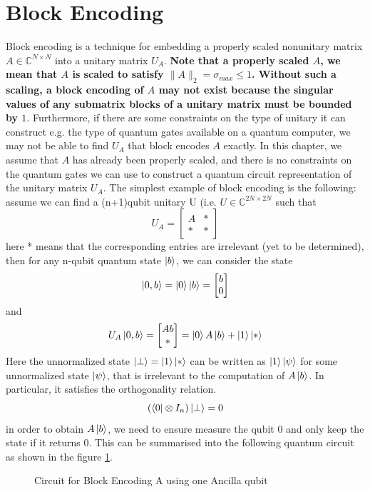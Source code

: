 \documentclass[12pt, oneside]{book}
\theoremstyle{definition}
\theoremstyle{definition}
\theoremstyle{remark}
\begin{document}
\section{Block Encoding}
Block encoding is a technique for embedding a properly scaled nonunitary matrix $A \in \mathbb{C}^{N\times N}$ into a unitary matrix $U_A$. \textbf{Note that a properly scaled $A$, we mean that $A$ is scaled to satisfy $\|A\|_2=\sigma_{max} \leq 1$. Without such a scaling, a block encoding of $A$ may not exist because the singular values of any submatrix blocks of a unitary matrix must be bounded by $1$}. Furthermore, if there are some constraints on the type of unitary it can construct e.g. the type of quantum gates available on a quantum computer, we may not be able to find $U_A$ that block encodes $A$ exactly. In this chapter, we assume that $A$ has already been properly scaled, and there is no constraints on the quantum gates we can use to construct a quantum circuit representation of the unitary matrix $U_A$.
The simplest example of block encoding is the following: assume we can find a (n+1)qubit unitary U (i.e. $U\in\mathbb{C}^{2N \times 2N}$ such that
\[
U_A=\begin{bmatrix}A & * \\ * & * \end{bmatrix}
\]
here * means that the corresponding entries are irrelevant (yet to be determined), then for any n-qubit quantum state $\ket{b}$, we can consider the state
\[
\ket{0,b}=\ket{0}\ket{b}=\begin{bmatrix}b \\ 0 \end{bmatrix}
\]
and
\[
U_A\ket{0,b}=\begin{bmatrix}Ab\\ * \end{bmatrix}=\ket{0}A\ket{b}+\ket{1}\ket{*}
\]
Here the unnormalized state $\ket{\perp}=\ket{1}\ket{*}$ can be written as $\ket{1}\ket{\psi}$ for some unnormalized state $\ket{\psi}$, that is irrelevant to the computation of $A\ket{b}$. In particular, it satisfies the orthogonality relation.
\[
(\bra{0}\otimes I_n)\ket{\perp}=0
\]
in order to obtain $A\ket{b}$, we need to ensure measure the qubit 0 and only keep the state if it returns 0. This can be summarised into the following quantum circuit as shown in the figure \ref{fig:blockencodingcircuit}.
\begin{figure}[ht]
    \centering
    \caption{Circuit for Block Encoding A using one Ancilla qubit}
    \label{fig:blockencodingcircuit}
\end{figure}
\end{document}
